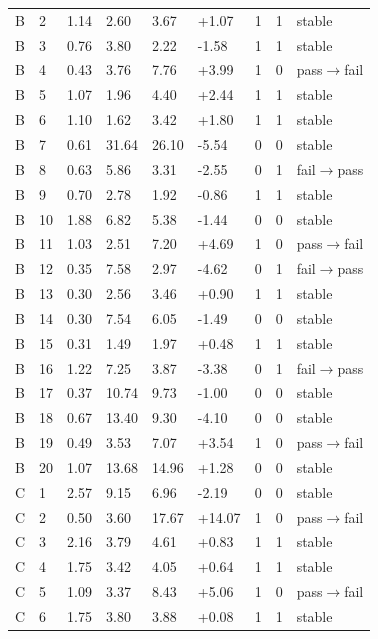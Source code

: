\documentclass[11pt,a4paper]{article}
\begin{document}
\begin{landscape}
{\begin{longtable}[]{@{}lllllllll@{}}
B & 2 & 1.14 & 2.60 & 3.67 & +1.07 & 1 & 1 & stable \\
B & 3 & 0.76 & 3.80 & 2.22 & -1.58 & 1 & 1 & stable \\
B & 4 & 0.43 & 3.76 & 7.76 & +3.99 & 1 & 0 & pass\ensuremath{\rightarrow}fail \\
B & 5 & 1.07 & 1.96 & 4.40 & +2.44 & 1 & 1 & stable \\
B & 6 & 1.10 & 1.62 & 3.42 & +1.80 & 1 & 1 & stable \\
B & 7 & 0.61 & 31.64 & 26.10 & -5.54 & 0 & 0 & stable \\
B & 8 & 0.63 & 5.86 & 3.31 & -2.55 & 0 & 1 & fail\ensuremath{\rightarrow}pass \\
B & 9 & 0.70 & 2.78 & 1.92 & -0.86 & 1 & 1 & stable \\
B & 10 & 1.88 & 6.82 & 5.38 & -1.44 & 0 & 0 & stable \\
B & 11 & 1.03 & 2.51 & 7.20 & +4.69 & 1 & 0 & pass\ensuremath{\rightarrow}fail \\
B & 12 & 0.35 & 7.58 & 2.97 & -4.62 & 0 & 1 & fail\ensuremath{\rightarrow}pass \\
B & 13 & 0.30 & 2.56 & 3.46 & +0.90 & 1 & 1 & stable \\
B & 14 & 0.30 & 7.54 & 6.05 & -1.49 & 0 & 0 & stable \\
B & 15 & 0.31 & 1.49 & 1.97 & +0.48 & 1 & 1 & stable \\
B & 16 & 1.22 & 7.25 & 3.87 & -3.38 & 0 & 1 & fail\ensuremath{\rightarrow}pass \\
B & 17 & 0.37 & 10.74 & 9.73 & -1.00 & 0 & 0 & stable \\
B & 18 & 0.67 & 13.40 & 9.30 & -4.10 & 0 & 0 & stable \\
B & 19 & 0.49 & 3.53 & 7.07 & +3.54 & 1 & 0 & pass\ensuremath{\rightarrow}fail \\
B & 20 & 1.07 & 13.68 & 14.96 & +1.28 & 0 & 0 & stable \\
C & 1 & 2.57 & 9.15 & 6.96 & -2.19 & 0 & 0 & stable \\
C & 2 & 0.50 & 3.60 & 17.67 & +14.07 & 1 & 0 & pass\ensuremath{\rightarrow}fail \\
C & 3 & 2.16 & 3.79 & 4.61 & +0.83 & 1 & 1 & stable \\
C & 4 & 1.75 & 3.42 & 4.05 & +0.64 & 1 & 1 & stable \\
C & 5 & 1.09 & 3.37 & 8.43 & +5.06 & 1 & 0 & pass\ensuremath{\rightarrow}fail \\
C & 6 & 1.75 & 3.80 & 3.88 & +0.08 & 1 & 1 & stable \\

\end{longtable}}
\end{landscape}
\end{document}

